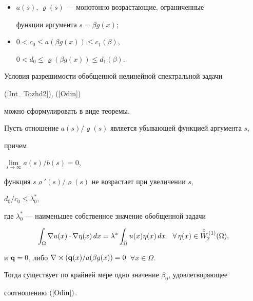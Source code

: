 \begin{itemize}


\item[1.] $a(s)$, $ \varrho(s)$ --- монотонно возрастающие, ограниченные


функции аргумента $s=\beta g(x)$;


\item[2.] $0 < c_0 \le a(\beta g(x)) \le c_1(\beta)$, 


$0 < d_0 \le \varrho(\beta g(x)) \le d_1(\beta)$.


\end{itemize}


Условия разрешимости обобщенной нелинейной спектральной задачи


(\ref{Int_Tozhd2}), (\ref{Odin})


можно сформулировать в виде теоремы.





\begin{thmnonum} 


Пусть отношение $a(s)/\varrho(s)$ является убывающей функцией аргумента $s$,


причем


$\lim\limits_{s \rightarrow \infty}{a(s)}/{b(s)} = 0$,


функция $s \varrho'(s)/\varrho(s)$ не возрастает при увеличении $s$, 


${d_0}/{c_0} \le \lambda_0^\ast$,


где $ \lambda_0^\ast$ --- наименьшее собственное значение обобщенной задачи


$$


\int_\Omega \nabla u(x) \cdot \nabla \eta (x) \, dx 


= \lambda^\ast	\int_\Omega u(x) \eta (x)\,dx 


\quad \forall \, \eta (x)\in \Sob,	


$$


и ${\bold q} = 0$, либо $\nabla \times


({\bold q} (x)/a(\beta g(x)) = 0 $\, $\forall x \in \Omega$.





Тогда существует по крайней мере одно значение $\beta_0$, удовлетворяющее


соотношению $(\ref{Odin})$.


\end{thmnonum} 





